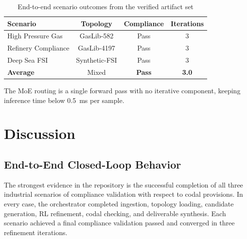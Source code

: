 \documentclass[conference]{IEEEtran}
\begin{document}







\begin{table}[!t]
\caption{End-to-end scenario outcomes from the verified artifact set}
\label{tab:perclass}
\centering
\setlength{\tabcolsep}{4pt}
\begin{tabular}{lccc}
\toprule
\textbf{Scenario} & \textbf{Topology} & \textbf{Compliance} & \textbf{Iterations} \\
\midrule
High Pressure Gas    & GasLib-582    & Pass & 3 \\
Refinery Compliance  & GasLib-4197   & Pass & 3 \\
Deep Sea FSI         & Synthetic-FSI & Pass & 3 \\
\midrule
\textbf{Average}     & Mixed         & \textbf{Pass} & \textbf{3.0} \\
\bottomrule
\end{tabular}
\end{table}

The MoE routing is a single forward pass with no iterative component, keeping inference time below 0.5~ms per sample.
 
\section{Discussion}

\subsection{End-to-End Closed-Loop Behavior}

The strongest evidence in the repository is the successful completion of all three industrial scenarios of compliance validation with respect to codal provisions. In every case, the orchestrator completed ingestion, topology loading, candidate generation, RL refinement, codal checking, and deliverable synthesis. Each scenario achieved a final compliance validation passed and converged in three refinement iterations.
 
\end{document}
